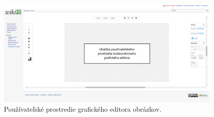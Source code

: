 \begin{figure}[H]	
	\centerline{\includegraphics[width=1\textwidth]{images/results/base-editor}}
	\caption{Používateľské prostredie grafického editora obrázkov.}
	\label{obr:base-user-interface}
\end{figure}
	
